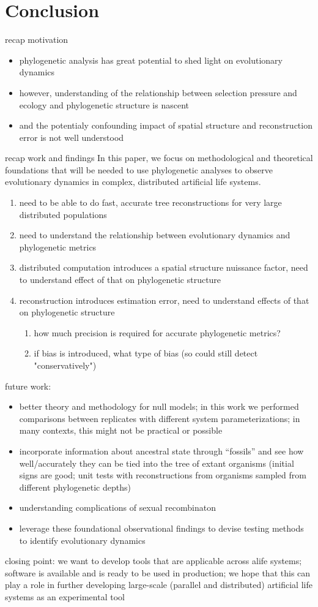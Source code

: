 \section{Conclusion} \label{sec:conclusion}

recap motivation
\begin{itemize}
    \item phylogenetic analysis has great potential to shed light on evolutionary dynamics
    \item however, understanding of the relationship between selection pressure and ecology and phylogenetic structure is nascent
    \item   and the potentialy confounding impact of spatial structure and reconstruction error is not well understood
\end{itemize}

recap work and findings
In this paper, we focus on methodological and theoretical foundations that will be needed to use phylogenetic analyses to observe evolutionary dynamics in complex, distributed artificial life systems.
\begin{enumerate}
    \item need to be able to do fast, accurate tree reconstructions for very large distributed populations
    \item need to understand the relationship between evolutionary dynamics and phylogenetic metrics 
    \item distributed computation introduces a spatial structure nuissance factor, need to understand effect of that on phylogenetic structure
    \item reconstruction introduces estimation error, need to understand effects of that on phylogenetic structure
    \begin{enumerate}
        \item how much precision is required for accurate phylogenetic metrics?
        \item if bias is introduced, what type of bias (so could still detect "conservatively")
    \end{enumerate}
    \end{enumerate}

future work:
\begin{itemize}
    \item better theory and methodology for null models; in this work we performed comparisons between replicates with different system parameterizations; in many contexts, this might not be practical or possible
    \item  incorporate information about ancestral state through ``fossils'' and see how well/accurately they can be tied into the tree of extant organisms (initial signs are good; unit tests with reconstructions from organisms sampled from different phylogenetic depths)
    \item  understanding complications of sexual recombinaton
    \item leverage these foundational observational findings to devise testing methods to identify evolutionary dynamics
\end{itemize}

closing point: we want to develop tools that are applicable across alife systems; software is available and is ready to be used in production; we hope that this can play a role in further developing large-scale (parallel and distributed) artificial life systems as an experimental tool
